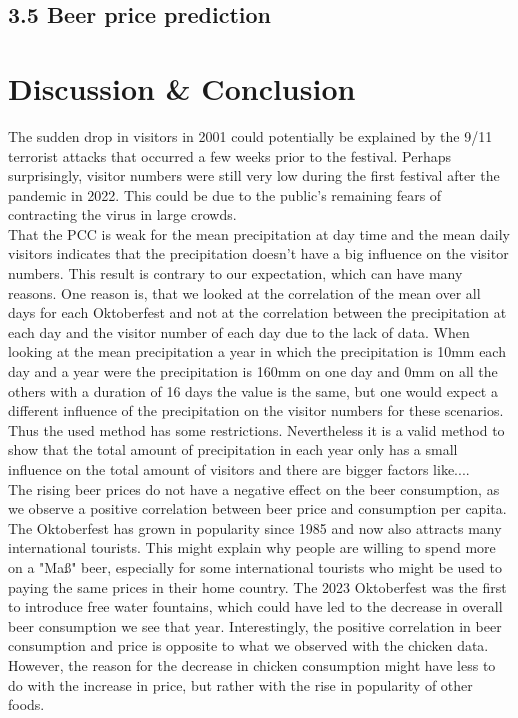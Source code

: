 \documentclass{article}
\theoremstyle{plain}
\theoremstyle{definition}
\theoremstyle{remark}
\begin{document}
\subsection*{3.5 Beer price prediction}

\section{Discussion \& Conclusion}\label{sec:conclusion}
The sudden drop in visitors in 2001 could potentially be explained by the 9/11 terrorist attacks that occurred a few weeks prior to the festival. Perhaps surprisingly, visitor numbers were still very low during the first festival after the pandemic in 2022. This could be due to the public's remaining fears of contracting the virus in large crowds.\\

That the PCC is weak for the mean precipitation at day time and the mean daily visitors indicates that the precipitation doesn't have a big influence on the visitor numbers. This result is contrary to our expectation, which can have many reasons. One reason is, that we looked at the correlation of the mean over all days for each Oktoberfest and not at the correlation between the precipitation at each day and the visitor number of each day due to the lack of data. When looking at the mean precipitation a year in which the precipitation is 10mm each day and a year were the precipitation is 160mm on one day and 0mm on all the others with a duration of 16 days the value is the same, but one would expect a different influence of the precipitation on the visitor numbers for these scenarios. Thus the used method has some restrictions. Nevertheless it is a valid method to show that the total amount of precipitation in each year only has a small influence on the total amount of visitors and there are bigger factors like....\\

The rising beer prices do not have a negative effect on the beer consumption, as we observe a positive correlation between beer price and consumption per capita. The Oktoberfest has grown in popularity since 1985 and now also attracts many international tourists. This might explain why people are willing to spend more on a "Maß" beer, especially for some international tourists who might be used to paying the same prices in their home country. The 2023 Oktoberfest was the first to introduce free water fountains, which could have led to the decrease in overall beer consumption we see that year. Interestingly, the positive correlation in beer consumption and price is opposite to what we observed with the chicken data. However, the reason for the decrease in chicken consumption might have less to do with the increase in price, but rather with the rise in popularity of other foods.\\
\end{document}
